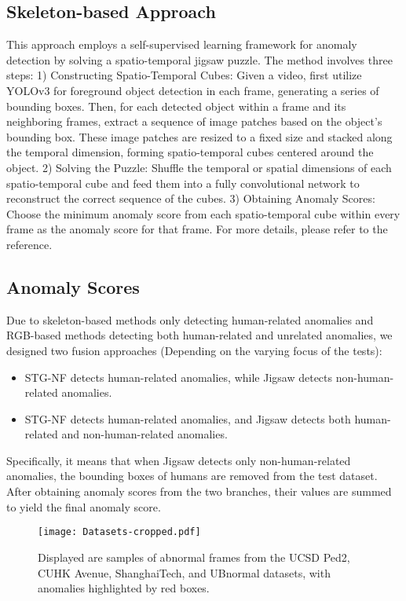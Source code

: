 \documentclass[conference]{IEEEtran}
\begin{document}
\subsection{Skeleton-based Approach}
This approach employs a self-supervised learning framework for anomaly detection by solving a spatio-temporal jigsaw puzzle. The method involves three steps: 1) Constructing Spatio-Temporal Cubes: Given a video, first utilize YOLOv3\cite{yolov3} for foreground object detection in each frame, generating a series of bounding boxes. Then, for each detected object within a frame and its neighboring frames, extract a sequence of image patches based on the object's bounding box. These image patches are resized to a fixed size and stacked along the temporal dimension, forming spatio-temporal cubes centered around the object. 2) Solving the Puzzle: Shuffle the temporal or spatial dimensions of each spatio-temporal cube and feed them into a fully convolutional network to reconstruct the correct sequence of the cubes. 3) Obtaining Anomaly Scores: Choose the minimum anomaly score from each spatio-temporal cube within every frame as the anomaly score for that frame. For more details, please refer to the reference\cite{jigsaw}.


\subsection{Anomaly Scores}
Due to skeleton-based methods only detecting human-related anomalies and RGB-based methods detecting both human-related and unrelated anomalies, we designed two fusion approaches (Depending on the varying focus of the tests):
\begin{itemize}
\item STG-NF detects human-related anomalies, while Jigsaw detects non-human-related anomalies.
\item STG-NF detects human-related anomalies, and Jigsaw detects both human-related and non-human-related anomalies.
\end{itemize}

Specifically, it means that when Jigsaw detects only non-human-related anomalies, the bounding boxes of humans are removed from the test dataset. After obtaining anomaly scores from the two branches, their values are summed to yield the final anomaly score.


\begin{figure}[htbp]
\texttt{[image: Datasets-cropped.pdf]}
\caption{Displayed are samples of abnormal frames from the UCSD Ped2, CUHK Avenue, ShanghaiTech, and UBnormal datasets, with anomalies highlighted by red boxes.}
\label{dataset}
\end{figure}
\end{document}
